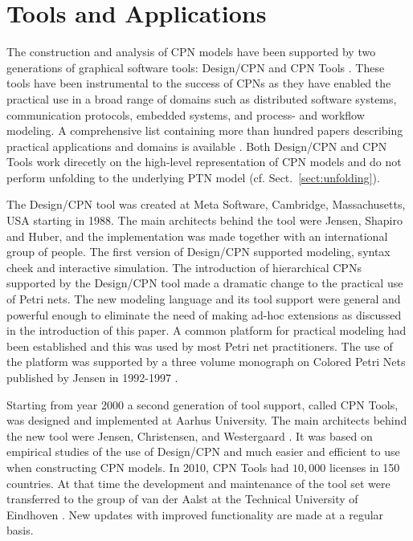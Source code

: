 \section{Tools and Applications}

The construction and analysis of CPN models have been supported by two
generations of graphical software tools: Design/CPN \cite{tacas97} and
CPN Tools \cite{cpn2003}. These tools have been instrumental to the
success of CPNs as they have enabled the practical use in a broad
range of domains such as distributed software systems, communication
protocols, embedded systems, and process- and workflow modeling. A
comprehensive list containing more than hundred papers describing
practical applications and domains is available \cite{cpnuse}. Both
Design/CPN and CPN Tools work direcetly on the high-level
representation of CPN models and do not perform unfolding to the
underlying PTN model (cf. Sect.~\ref{sect:unfolding}).

The Design/CPN tool \cite{tacas97} was created at Meta Software,
Cambridge, Massachusetts, USA starting in 1988. The main architects
behind the tool were Jensen, Shapiro and Huber, and the implementation
was made together with an international group of people. The first
version of Design/CPN supported modeling, syntax cheek and interactive
simulation. The introduction of hierarchical CPNs supported by the
Design/CPN tool made a dramatic change to the practical use of Petri
nets. The new modeling language and its tool support were general and
powerful enough to eliminate the need of making ad-hoc extensions as
discussed in the introduction of this paper. A common platform for
practical modeling had been established and this was used by most
Petri net practitioners. The use of the platform was supported by a
three volume monograph on Colored Petri Nets published by Jensen in
1992-1997 \cite{jensen:cpnvols}.

Starting from year 2000 a second generation of tool support, called
CPN Tools, was designed and implemented at Aarhus University. The main
architects behind the new tool were Jensen, Christensen, and
Westergaard \cite{cpn2003}.  It was based on empirical studies of the
use of Design/CPN and much easier and efficient to use when
constructing CPN models. In 2010, CPN Tools had $10,000$ licenses in
150 countries. At that time the development and maintenance of the
tool set were transferred to the group of van der Aalst at the
Technical University of Eindhoven \cite{cpn2003}. New updates with improved
functionality are made at a regular basis.

